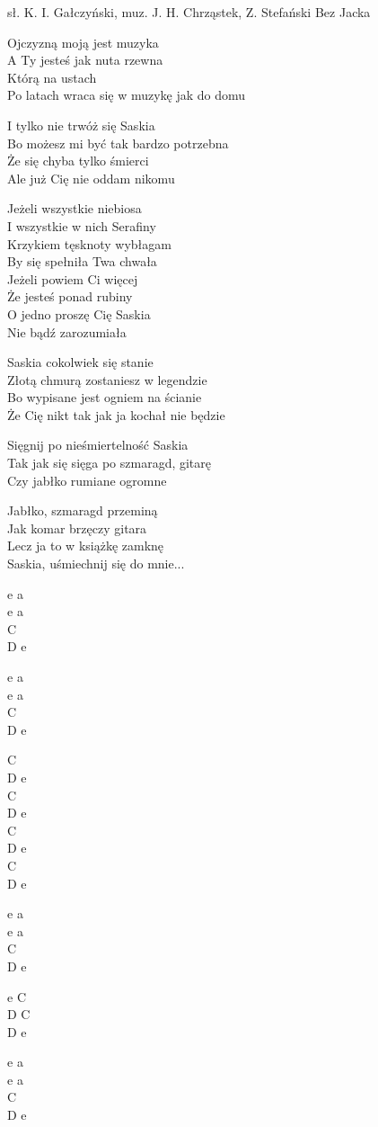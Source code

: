 {sł. K. I. Gałczyński, muz. J. H. Chrząstek, Z. Stefański}
{Bez Jacka}
\begin{text}
Ojczyzną moją jest muzyka\\
A Ty jesteś jak nuta rzewna\\
Którą na ustach\\
Po latach wraca się w muzykę jak do domu

I tylko nie trwóż się Saskia\\
Bo możesz mi być tak bardzo potrzebna\\
Że się chyba tylko śmierci\\
Ale już Cię nie oddam nikomu

Jeżeli wszystkie niebiosa\\
I wszystkie w nich Serafiny\\
Krzykiem tęsknoty wybłagam\\
By się spełniła Twa chwała\\
Jeżeli powiem Ci więcej\\
Że jesteś ponad rubiny\\
O jedno proszę Cię Saskia\\
Nie bądź zarozumiała

Saskia cokolwiek się stanie\\
Złotą chmurą zostaniesz w legendzie\\
Bo wypisane jest ogniem na ścianie\\
Że Cię nikt tak jak ja kochał nie będzie

Sięgnij po nieśmiertelność Saskia\\
Tak jak się sięga po szmaragd, gitarę\\
Czy jabłko rumiane ogromne

Jabłko, szmaragd przeminą\\
Jak komar brzęczy gitara\\
Lecz ja to w książkę zamknę\\
Saskia, uśmiechnij się do mnie...
\end{text}
\begin{chord}
    e a\\
    e a\\
    C\\
    D e

    e a\\
    e a\\
    C\\
    D e

    C\\
    D e\\
    C\\
    D e\\
    C\\
    D e\\
    C\\
    D e

    e a\\
    e a\\
    C\\
    D e

    e C\\
    D C\\
    D e

    e a\\
    e a\\
    C\\
    D e
\end{chord}
